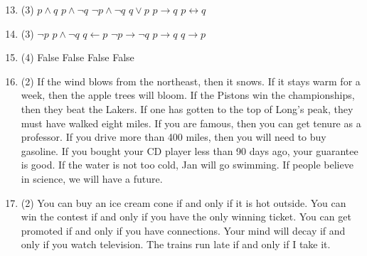 \documentclass[12pt]{article}
\newcommand{\enumset}[1]{\setcounter{enumi}{#1}}
\begin{document}
\begin{enumerate}
				\enumset{12}
				\item
					\begin{tasks}(3)
						\task
							\(p \land q\)
						\task
							\(p \land \lnot q\)
						\task
							\(\lnot p \land \lnot q\)
						\task
							\(q \lor p\)
						\task
							\(p \to q\)
						\task
							\(p \leftrightarrow q\)
					\end{tasks}
				\enumset{14}
				\item
					\begin{tasks}(3)
						\task
							\(\lnot p\)
						\task
							\(p \land \lnot q\)
						\task
							\(q \leftarrow p\)
						\task
							\(\lnot p \to \lnot q\)
						\task
							\(p \to q\)
						\task
							\(q \to p\)
					\end{tasks}
				\enumset{18}
				\item
					\begin{tasks}(4)
						\task
							False
						\task
							False
						\task
							False
						\task
							False	
					\end{tasks}
				\newpage
				\enumset{24}
				\item
					\begin{tasks}(2)
						\task
							If the wind blows from the northeast, then it snows.
						\task
							If it stays warm for a week, then the apple trees will bloom.
						\task
							If the Pistons win the championships, then they beat the Lakers.
						\task
							If one has gotten to the top of Long's peak, they must have walked eight miles.
						\task
							If you are famous, then you can get tenure as a professor.
						\task
							If you drive more than 400 miles, then you will need to buy gasoline.
						\task
							If you bought your CD player less than 90 days ago, your guarantee is good.
						\task
							If the water is not too cold, Jan will go swimming.
						\task
							If people believe in science, we will have a future.
					\end{tasks}
				\enumset{26}
				\item
					\begin{tasks}(2)
						\task
							You can buy an ice cream cone if and only if it is hot outside.
						\task
							You can win the contest if and only if you have the only winning ticket.
						\task
							You can get promoted if and only if you have connections.
						\task
							Your mind will decay if and only if you watch television.
						\task
							The trains run late if and only if I take it.
					\end{tasks}

\end{enumerate}
\end{document}
